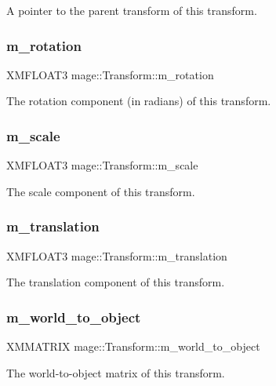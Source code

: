 A pointer to the parent transform of this transform. \hypertarget{structmage_1_1_transform_a037b4fb338bfe79aa2ab1a2e809c40df}{}\label{structmage_1_1_transform_a037b4fb338bfe79aa2ab1a2e809c40df} 
\subsubsection{\texorpdfstring{m\+\_\+rotation}{m\_rotation}}
{\footnotesize\ttfamily X\+M\+F\+L\+O\+A\+T3 mage\+::\+Transform\+::m\+\_\+rotation\hspace{0.3cm}{\ttfamily [private]}}

The rotation component (in radians) of this transform. \hypertarget{structmage_1_1_transform_a25d15c85b93037bab5b755c86bef0b54}{}\label{structmage_1_1_transform_a25d15c85b93037bab5b755c86bef0b54} 
\subsubsection{\texorpdfstring{m\+\_\+scale}{m\_scale}}
{\footnotesize\ttfamily X\+M\+F\+L\+O\+A\+T3 mage\+::\+Transform\+::m\+\_\+scale\hspace{0.3cm}{\ttfamily [private]}}

The scale component of this transform. \hypertarget{structmage_1_1_transform_a57e27b28e0cf85be034055a68513ad79}{}\label{structmage_1_1_transform_a57e27b28e0cf85be034055a68513ad79} 
\subsubsection{\texorpdfstring{m\+\_\+translation}{m\_translation}}
{\footnotesize\ttfamily X\+M\+F\+L\+O\+A\+T3 mage\+::\+Transform\+::m\+\_\+translation\hspace{0.3cm}{\ttfamily [private]}}

The translation component of this transform. \hypertarget{structmage_1_1_transform_a873fefd93a3c1ca938e2bbecdbc5b3ac}{}\label{structmage_1_1_transform_a873fefd93a3c1ca938e2bbecdbc5b3ac} 
\subsubsection{\texorpdfstring{m\+\_\+world\+\_\+to\+\_\+object}{m\_world\_to\_object}}
{\footnotesize\ttfamily X\+M\+M\+A\+T\+R\+IX mage\+::\+Transform\+::m\+\_\+world\+\_\+to\+\_\+object\hspace{0.3cm}{\ttfamily [private]}}

The world-\/to-\/object matrix of this transform. 